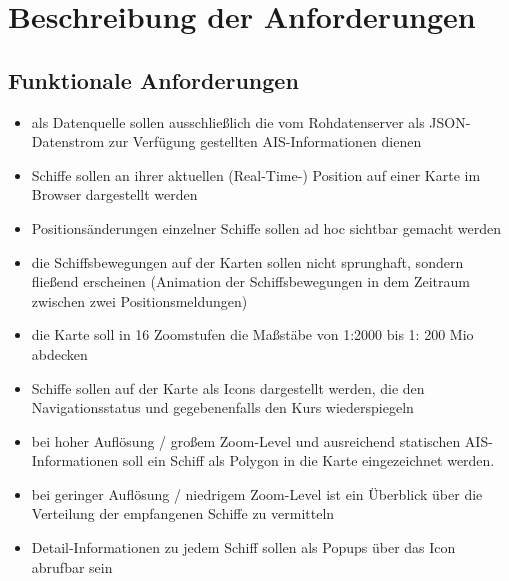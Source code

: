 \section{Beschreibung der Anforderungen}\label{s.Beschreibung der Anforderungen}


\subsection{Funktionale Anforderungen}\label{Funktionale Anforderungen}
\begin{itemize}

\item als Datenquelle sollen ausschließlich die vom Rohdatenserver als JSON-Datenstrom zur Verfügung gestellten AIS-Informationen dienen
\item Schiffe sollen an ihrer aktuellen (Real-Time-) Position auf einer Karte im Browser dargestellt werden
\item Positionsänderungen einzelner Schiffe sollen ad hoc sichtbar gemacht werden
\item die Schiffsbewegungen auf der Karten sollen nicht sprunghaft, sondern fließend erscheinen (Animation der Schiffsbewegungen in dem Zeitraum zwischen zwei Positionsmeldungen)
\item die Karte soll in 16 Zoomstufen die Maßstäbe von 1:2000 bis 1: 200 Mio abdecken
\item Schiffe sollen auf der Karte als Icons dargestellt werden, die den Navigationsstatus und gegebenenfalls den Kurs wiederspiegeln
\item bei hoher Auflösung / großem Zoom-Level und ausreichend statischen AIS-Informationen soll ein Schiff als Polygon in die Karte eingezeichnet werden.
\item bei geringer Auflösung / niedrigem Zoom-Level ist ein Überblick über die Verteilung der empfangenen Schiffe zu vermitteln
\item Detail-Informationen zu jedem Schiff sollen als Popups über das Icon abrufbar sein
\end{itemize}


